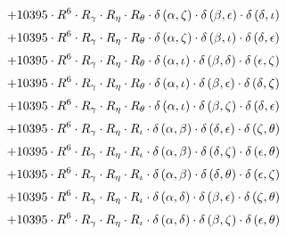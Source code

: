 \begin{subequations}
\begin{gather}
 \\[0.2em] \notag 		 + 10395 \cdot R^{6} \cdot R_{\gamma{}} \cdot R_{\eta{}} \cdot R_{\theta{}} \cdot \delta{}\left(\alpha{}, \zeta{}\right) \cdot \delta{}\left(\beta{}, \epsilon{}\right) \cdot \delta{}\left(\delta{}, \iota{}\right) 
 \\[0.2em] \notag 		 + 10395 \cdot R^{6} \cdot R_{\gamma{}} \cdot R_{\eta{}} \cdot R_{\theta{}} \cdot \delta{}\left(\alpha{}, \zeta{}\right) \cdot \delta{}\left(\beta{}, \iota{}\right) \cdot \delta{}\left(\delta{}, \epsilon{}\right) 
 \\[0.2em] \notag 		 + 10395 \cdot R^{6} \cdot R_{\gamma{}} \cdot R_{\eta{}} \cdot R_{\theta{}} \cdot \delta{}\left(\alpha{}, \iota{}\right) \cdot \delta{}\left(\beta{}, \delta{}\right) \cdot \delta{}\left(\epsilon{}, \zeta{}\right) 
 \\[0.2em] \notag 		 + 10395 \cdot R^{6} \cdot R_{\gamma{}} \cdot R_{\eta{}} \cdot R_{\theta{}} \cdot \delta{}\left(\alpha{}, \iota{}\right) \cdot \delta{}\left(\beta{}, \epsilon{}\right) \cdot \delta{}\left(\delta{}, \zeta{}\right) 
 \\[0.2em] \notag 		 + 10395 \cdot R^{6} \cdot R_{\gamma{}} \cdot R_{\eta{}} \cdot R_{\theta{}} \cdot \delta{}\left(\alpha{}, \iota{}\right) \cdot \delta{}\left(\beta{}, \zeta{}\right) \cdot \delta{}\left(\delta{}, \epsilon{}\right) 
 \\[0.2em] \notag 		 + 10395 \cdot R^{6} \cdot R_{\gamma{}} \cdot R_{\eta{}} \cdot R_{\iota{}} \cdot \delta{}\left(\alpha{}, \beta{}\right) \cdot \delta{}\left(\delta{}, \epsilon{}\right) \cdot \delta{}\left(\zeta{}, \theta{}\right) 
 \\[0.2em] \notag 		 + 10395 \cdot R^{6} \cdot R_{\gamma{}} \cdot R_{\eta{}} \cdot R_{\iota{}} \cdot \delta{}\left(\alpha{}, \beta{}\right) \cdot \delta{}\left(\delta{}, \zeta{}\right) \cdot \delta{}\left(\epsilon{}, \theta{}\right) 
 \\[0.2em] \notag 		 + 10395 \cdot R^{6} \cdot R_{\gamma{}} \cdot R_{\eta{}} \cdot R_{\iota{}} \cdot \delta{}\left(\alpha{}, \beta{}\right) \cdot \delta{}\left(\delta{}, \theta{}\right) \cdot \delta{}\left(\epsilon{}, \zeta{}\right) 
 \\[0.2em] \notag 		 + 10395 \cdot R^{6} \cdot R_{\gamma{}} \cdot R_{\eta{}} \cdot R_{\iota{}} \cdot \delta{}\left(\alpha{}, \delta{}\right) \cdot \delta{}\left(\beta{}, \epsilon{}\right) \cdot \delta{}\left(\zeta{}, \theta{}\right) 
 \\[0.2em] \notag 		 + 10395 \cdot R^{6} \cdot R_{\gamma{}} \cdot R_{\eta{}} \cdot R_{\iota{}} \cdot \delta{}\left(\alpha{}, \delta{}\right) \cdot \delta{}\left(\beta{}, \zeta{}\right) \cdot \delta{}\left(\epsilon{}, \theta{}\right) 

\end{gather}
\end{subequations}
